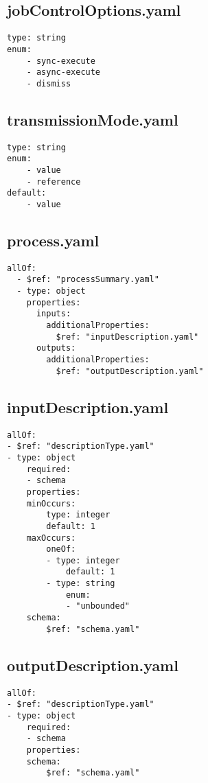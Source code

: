 \subsection{jobControlOptions.yaml}
\begin{lstlisting}[caption={jobControlOptions.yaml}, style = JSON]
type: string
enum:
    - sync-execute
    - async-execute
    - dismiss
\end{lstlisting}\label{appendixjobControlOptionsyaml} 

\subsection{transmissionMode.yaml}
\begin{lstlisting}[caption={transmissionMode.yaml}, style = JSON]
type: string
enum:
    - value
    - reference
default:
    - value
\end{lstlisting}\label{appendixtransmissionModeyaml} 

\subsection{process.yaml}
\begin{lstlisting}[caption={process.yaml}, style = JSON]
allOf:
  - $ref: "processSummary.yaml"
  - type: object
    properties:
      inputs:
        additionalProperties:
          $ref: "inputDescription.yaml"
      outputs:
        additionalProperties:
          $ref: "outputDescription.yaml"
\end{lstlisting}\label{appendixprocessyaml} 

\subsection{inputDescription.yaml}
\begin{lstlisting}[caption={inputDescription.yaml}, style = JSON]
allOf:
- $ref: "descriptionType.yaml"
- type: object
    required:
    - schema
    properties:
    minOccurs:
        type: integer
        default: 1
    maxOccurs:
        oneOf:
        - type: integer
            default: 1
        - type: string
            enum:
            - "unbounded"
    schema:
        $ref: "schema.yaml"
\end{lstlisting}\label{appendixinputDescriptionyaml} 

\subsection{outputDescription.yaml}
\begin{lstlisting}[caption={outputDescription.yaml}, style = JSON]
allOf:
- $ref: "descriptionType.yaml"
- type: object
    required:
    - schema
    properties:
    schema:
        $ref: "schema.yaml"
\end{lstlisting}\label{appendixoutputDescriptionyaml} 

